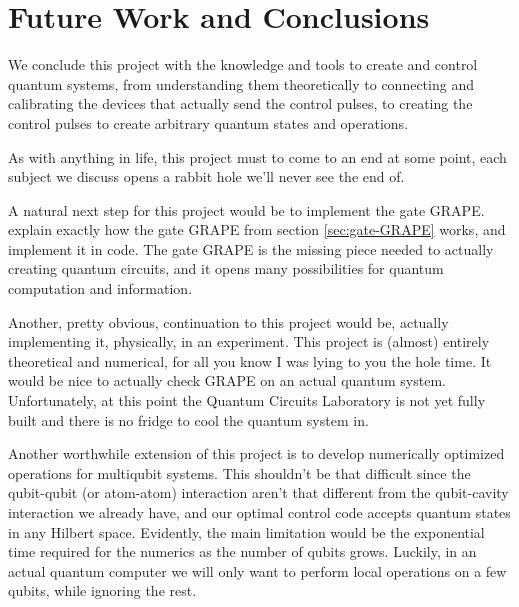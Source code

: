 \section{Future Work and Conclusions}
We conclude this project with the knowledge and tools to create and control quantum systems, from understanding them theoretically to connecting and calibrating the devices that actually send the control pulses, to creating the control pulses to create arbitrary quantum states and operations.

As with anything in life, this project must to come to an end at some point, each subject we discuss opens a rabbit hole we'll never see the end of.

A natural next step for this project would be to implement the gate GRAPE. explain exactly how the gate GRAPE from section \ref{sec:gate-GRAPE} works, and implement it in code. The gate GRAPE is the missing piece needed to actually creating quantum circuits, and it opens many possibilities for quantum computation and information.

Another, pretty obvious, continuation to this project would be, actually implementing it, physically, in an experiment. This project is (almost) entirely theoretical and numerical, for all you know I was lying to you the hole time. It would be nice to actually check GRAPE on an actual quantum system. Unfortunately, at this point the Quantum Circuits Laboratory is not yet fully built and there is no fridge to cool the quantum system in.

 Another worthwhile extension of this project is to develop numerically optimized operations for multiqubit systems. This shouldn't be that difficult since the qubit-qubit (or atom-atom) interaction aren't that different from the qubit-cavity interaction we already have, and our optimal control code accepts quantum states in any Hilbert space. Evidently, the main limitation would be the exponential time required for the numerics as the number of qubits grows. Luckily, in an actual quantum computer we will only want to perform local operations on a few qubits, while ignoring the rest. 

